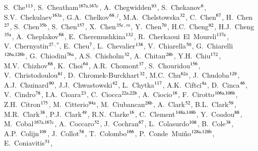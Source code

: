 \begin{flushleft}
S.~Che$^\textrm{\scriptsize 113}$,
S.~Cheatham$^\textrm{\scriptsize 167a,167c}$,
A.~Chegwidden$^\textrm{\scriptsize 93}$,
S.~Chekanov$^\textrm{\scriptsize 6}$,
S.V.~Chekulaev$^\textrm{\scriptsize 163a}$,
G.A.~Chelkov$^\textrm{\scriptsize 68}$$^{,l}$,
M.A.~Chelstowska$^\textrm{\scriptsize 32}$,
C.~Chen$^\textrm{\scriptsize 67}$,
H.~Chen$^\textrm{\scriptsize 27}$,
S.~Chen$^\textrm{\scriptsize 35b}$,
S.~Chen$^\textrm{\scriptsize 157}$,
X.~Chen$^\textrm{\scriptsize 35c}$$^{,m}$,
Y.~Chen$^\textrm{\scriptsize 70}$,
H.C.~Cheng$^\textrm{\scriptsize 92}$,
H.J.~Cheng$^\textrm{\scriptsize 35a}$,
A.~Cheplakov$^\textrm{\scriptsize 68}$,
E.~Cheremushkina$^\textrm{\scriptsize 132}$,
R.~Cherkaoui~El~Moursli$^\textrm{\scriptsize 137e}$,
V.~Chernyatin$^\textrm{\scriptsize 27}$$^{,*}$,
E.~Cheu$^\textrm{\scriptsize 7}$,
L.~Chevalier$^\textrm{\scriptsize 138}$,
V.~Chiarella$^\textrm{\scriptsize 50}$,
G.~Chiarelli$^\textrm{\scriptsize 126a,126b}$,
G.~Chiodini$^\textrm{\scriptsize 76a}$,
A.S.~Chisholm$^\textrm{\scriptsize 32}$,
A.~Chitan$^\textrm{\scriptsize 28b}$,
Y.H.~Chiu$^\textrm{\scriptsize 172}$,
M.V.~Chizhov$^\textrm{\scriptsize 68}$,
K.~Choi$^\textrm{\scriptsize 64}$,
A.R.~Chomont$^\textrm{\scriptsize 37}$,
S.~Chouridou$^\textrm{\scriptsize 156}$,
V.~Christodoulou$^\textrm{\scriptsize 81}$,
D.~Chromek-Burckhart$^\textrm{\scriptsize 32}$,
M.C.~Chu$^\textrm{\scriptsize 62a}$,
J.~Chudoba$^\textrm{\scriptsize 129}$,
A.J.~Chuinard$^\textrm{\scriptsize 90}$,
J.J.~Chwastowski$^\textrm{\scriptsize 42}$,
L.~Chytka$^\textrm{\scriptsize 117}$,
A.K.~Ciftci$^\textrm{\scriptsize 4a}$,
D.~Cinca$^\textrm{\scriptsize 46}$,
V.~Cindro$^\textrm{\scriptsize 78}$,
I.A.~Cioara$^\textrm{\scriptsize 23}$,
C.~Ciocca$^\textrm{\scriptsize 22a,22b}$,
A.~Ciocio$^\textrm{\scriptsize 16}$,
F.~Cirotto$^\textrm{\scriptsize 106a,106b}$,
Z.H.~Citron$^\textrm{\scriptsize 175}$,
M.~Citterio$^\textrm{\scriptsize 94a}$,
M.~Ciubancan$^\textrm{\scriptsize 28b}$,
A.~Clark$^\textrm{\scriptsize 52}$,
B.L.~Clark$^\textrm{\scriptsize 59}$,
M.R.~Clark$^\textrm{\scriptsize 38}$,
P.J.~Clark$^\textrm{\scriptsize 49}$,
R.N.~Clarke$^\textrm{\scriptsize 16}$,
C.~Clement$^\textrm{\scriptsize 148a,148b}$,
Y.~Coadou$^\textrm{\scriptsize 88}$,
M.~Cobal$^\textrm{\scriptsize 167a,167c}$,
A.~Coccaro$^\textrm{\scriptsize 52}$,
J.~Cochran$^\textrm{\scriptsize 67}$,
L.~Colasurdo$^\textrm{\scriptsize 108}$,
B.~Cole$^\textrm{\scriptsize 38}$,
A.P.~Colijn$^\textrm{\scriptsize 109}$,
J.~Collot$^\textrm{\scriptsize 58}$,
T.~Colombo$^\textrm{\scriptsize 166}$,
P.~Conde~Mui\~no$^\textrm{\scriptsize 128a,128b}$,
E.~Coniavitis$^\textrm{\scriptsize 51}$,
$$
\end{flushleft}
